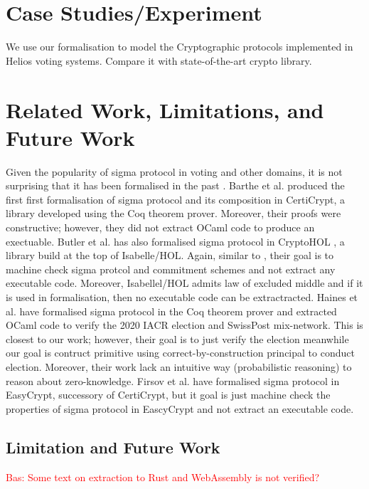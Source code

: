 \documentclass[conference,compsoc]{IEEEtran}
\begin{document}
\section{Case Studies/Experiment}\label{case_studies}
  We use our formalisation to model the Cryptographic protocols implemented in 
  Helios voting systems. Compare it with state-of-the-art 
  crypto library. 


\section{Related Work, Limitations, and Future Work}\label{rel_work}
  Given the popularity of sigma protocol in voting 
  and other domains, it is not surprising that it has 
  been formalised in the past \cite{5552642,9519460,
  butler2021formalising,10.1145/3319535.3354247,287095,almeida2010certifying,10221929,
  10.1145/3594735}. Barthe et al. \cite{5552642}  produced the 
  first first formalisation of sigma protocol and its composition in 
  CertiCrypt, a library developed using the Coq theorem prover. 
  Moreover, their proofs were constructive; however, they 
  did not extract OCaml code to produce an exectuable. 
  Butler et al. \cite{ butler2021formalising} has also 
  formalised sigma protocol in CryptoHOL \cite{10.1007/978-3-662-49498-1_20}, a library 
  build at the top of Isabelle/HOL. Again, similar to  \cite{5552642}, 
  their goal is to machine check sigma protcol and commitment schemes 
  and not extract any executable code. Moreover, Isabellel/HOL admits 
  law of excluded middle and if it is used in formalisation, 
  then no executable code can be extractracted. Haines et al. 
  \cite{287095,10.1145/3319535.3354247} have formalised 
  sigma protocol in the Coq theorem prover and extracted OCaml code 
  to verify the 2020 IACR election and SwissPost mix-network. This is 
  closest to our work; however, their goal is to just verify the 
  election meanwhile our goal is contruct primitive using 
  correct-by-construction principal to conduct election. Moreover, 
  their work lack an intuitive way (probabilistic reasoning) 
  to reason about zero-knowledge. Firsov et al. \cite{10221929}
  have formalised sigma protocol in EasyCrypt, successory 
  of CertiCrypt, but it goal is just machine check 
  the properties of sigma protocol in EascyCrypt 
  and not extract an executable code. 

  
  \subsection{Limitation and Future Work}
   \textcolor{red}{Bas: Some text on extraction to Rust and WebAssembly is not verified?}
\end{document}
